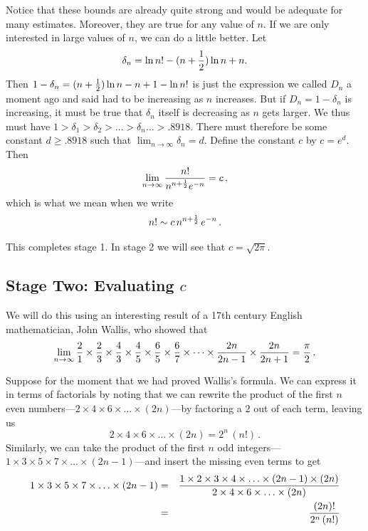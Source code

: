 {{{{	Notice that these bounds are already quite strong 
and would be adequate for many estimates.  Moreover, they are true for any value of $n$.  If we are only interested in large values of $n$, we can do a little better.  Let 
\[
\delta_n=\ln n!-(n+{1 \over 2})\ln n +n.
\] 
Then $1-\delta_n=(n+{1 \over 2})\ln n -n +1-\ln n!$ is just the expression we called $D_n$ a moment ago and said had to be increasing as $n$ increases.  But if $D_n=1-\delta_n$ is increasing, it must be true that $\delta_n$ itself is decreasing as $n$ gets larger.  We thus must have $1>\delta_1>\delta_2>\ldots >\delta_n \ldots >.8918$.  There must therefore be some constant $d\geq .8918$ such that $\lim_{n\rightarrow \infty}\delta_n=d$. Define the constant $c$ by $c=e^d$. Then
\[
\lim_{n\rightarrow \infty}{n! \over n^{n+{1 \over 2}}e^{-n}} = c\,,
\]
which is what we mean when we write
\[
n!\sim c\,n^{n+{1 \over 2}}\,e^{-n} \,.
\]


This completes stage 1.  In stage 2 we will see that $c=\sqrt{2\pi}$.





\subsection{Stage Two: Evaluating $c$}

We will do this using an interesting result of a 17th century English mathematician, John Wallis, 
who showed that
\[
\lim_{n \rightarrow \infty} {2 \over 1}\times {2 \over 3}\times {4 \over 3}\times {4 \over 5}\times {6 \over 5}\times {6 \over 7}\times \cdots \times {2n \over 2n-1}\times {2n \over 2n+1} = {\pi \over 2} \, .
\]

Suppose for the moment that we had proved Wallis's formula. We can express it in terms of factorials by noting that we can rewrite the product of the first $n$ even numbers---$2\times 4\times 6\times \ldots \times (2n)$---by factoring a $2$ out of each term, leaving us 
\[
2\times 4\times 6\times \ldots \times (2n) = 2^n\,(n!)\,.
\]
Similarly, we can take the product of the first $n$ odd integers---$1\times 3\times 5\times 7\times \ldots \times (2n-1)$---and insert the missing even terms to get
\begin{eqnarray*}
1\times 3\times 5\times 7\times \ldots \times (2n-1) &=&{1\times 2\times 3\times 4\times \ldots \times (2n-1)\times (2n) \over 2\times 4\times 6\times \ldots \times (2n)} \\
&=&{(2n)! \over 2^n\,(n!)}
\end{eqnarray*}

}}}}
